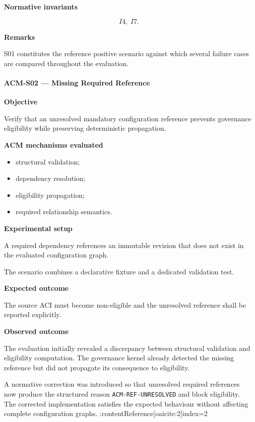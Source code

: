 \documentclass[10pt]{article}
\begin{document}
\textbf{Normative invariants}

\[
I4,\;
I7.
\]

\textbf{Remarks}

S01 constitutes the reference positive scenario against which several failure
cases are compared throughout the evaluation.

\paragraph{ACM-S02 --- Missing Required Reference}

\textbf{Objective}

Verify that an unresolved mandatory configuration reference prevents governance
eligibility while preserving deterministic propagation.

\textbf{ACM mechanisms evaluated}

\begin{itemize}
\item structural validation;
\item dependency resolution;
\item eligibility propagation;
\item required relationship semantics.
\end{itemize}

\textbf{Experimental setup}

A required dependency references an immutable revision that does not exist in
the evaluated configuration graph.

The scenario combines a declarative fixture and a dedicated validation test.

\textbf{Expected outcome}

The source ACI must become non-eligible and the unresolved reference shall be
reported explicitly.

\textbf{Observed outcome}

The evaluation initially revealed a discrepancy between structural validation
and eligibility computation. The governance kernel already detected the missing
reference but did not propagate its consequence to eligibility.

A normative correction was introduced so that unresolved required references
now produce the structured reason
\texttt{ACM-REF-UNRESOLVED} and block eligibility.
The corrected implementation satisfies the expected behaviour without affecting
complete configuration graphs. :contentReference[oaicite:2]{index=2}
\end{document}

